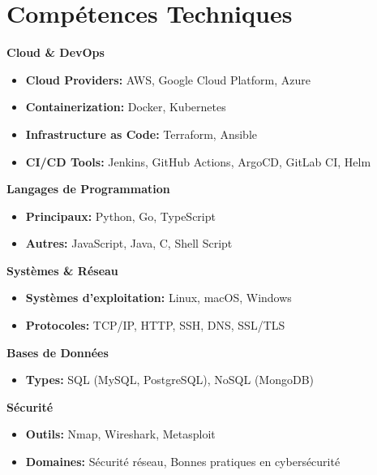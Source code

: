 \section{Compétences Techniques}\label{sec:competences-techniques}
\begin{multicols}{2}
    \textbf{\large Cloud \& DevOps}
    \begin{itemize}
        \item \textbf{Cloud Providers:}   AWS, Google Cloud Platform, Azure
        \item \textbf{Containerization:} Docker, Kubernetes
        \item \textbf{Infrastructure as Code:} Terraform, Ansible
        \item \textbf{CI/CD Tools:} Jenkins, GitHub Actions, ArgoCD, GitLab CI, Helm
    \end{itemize}

    \textbf{\large Langages de Programmation}
    \begin{itemize}
        \item \textbf{Principaux:} Python, Go, TypeScript
        \item \textbf{Autres:} JavaScript, Java, C, Shell Script
    \end{itemize}

    \textbf{\large Systèmes \& Réseau}
    \begin{itemize}
        \item \textbf{Systèmes d'exploitation:} Linux, macOS, Windows
        \item \textbf{Protocoles:} TCP/IP, HTTP, SSH, DNS, SSL/TLS
    \end{itemize}

    \textbf{\large Bases de Données}
    \begin{itemize}
        \item \textbf{Types:} SQL (MySQL, PostgreSQL), NoSQL (MongoDB)
    \end{itemize}

    \textbf{\large Sécurité}
    \begin{itemize}
        \item \textbf{Outils:} Nmap, Wireshark, Metasploit
        \item \textbf{Domaines:} Sécurité réseau, Bonnes pratiques en cybersécurité
    \end{itemize}
\end{multicols}
